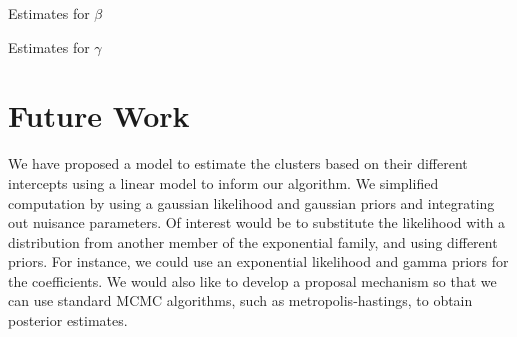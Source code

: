\documentclass[mathserif]{article}
\begin{document}
\begin{table}
  \centering
  
  \vspace{-3mm}
  \caption{Estimates for $\beta$}
  \vspace{8mm}
  
  \vspace{-3mm}
  \caption{Estimates for $\gamma$}
\end{table}

\section*{Future Work}
We have proposed a model to estimate the clusters based on their different
intercepts using a linear model to inform our algorithm. We simplified 
computation by using a gaussian likelihood and gaussian priors and integrating
out nuisance parameters. Of interest would be to substitute the
likelihood with a distribution from another member of the exponential
family, and using different priors. For instance, we could use
an exponential likelihood and gamma priors for the coefficients.
We would also like to develop a proposal mechanism so that
we can use standard MCMC algorithms, such as metropolis-hastings,
to obtain posterior estimates.
\end{document}
